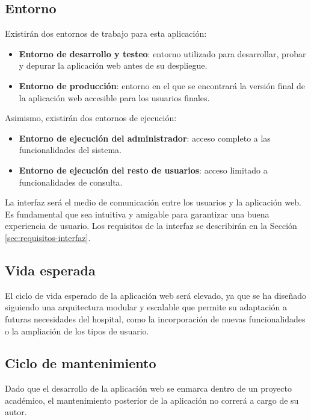 \subsection{Entorno}
Existirán dos entornos de trabajo para esta aplicación:

\begin{itemize}
\item \textbf{Entorno de desarrollo y testeo}: entorno utilizado para desarrollar, probar y depurar la aplicación web antes de su despliegue.
\item \textbf{Entorno de producción}: entorno en el que se encontrará la versión final de la aplicación web accesible para los usuarios finales.
\end{itemize}

Asimismo, existirán dos entornos de ejecución:

\begin{itemize}
\item \textbf{Entorno de ejecución del administrador}: acceso completo a las funcionalidades del sistema.
\item \textbf{Entorno de ejecución del resto de usuarios}: acceso limitado a funcionalidades de consulta.
\end{itemize}

La interfaz será el medio de comunicación entre los usuarios y la aplicación web. Es fundamental que sea intuitiva y amigable para garantizar una buena experiencia de usuario. Los requisitos de la interfaz se describirán en la Sección \ref{sec:requisitos-interfaz}.  
\subsection{Vida esperada}

    El ciclo de vida esperado de la aplicación web será elevado, ya que se ha diseñado siguiendo una
    arquitectura modular y escalable que permite su adaptación a futuras necesidades del hospital,
    como la incorporación de nuevas funcionalidades o la ampliación de los tipos de usuario.

\subsection{Ciclo de mantenimiento} \label{subsec:ciclo_mantenimiento}

Dado que el desarrollo de la aplicación web se enmarca dentro de un proyecto académico, el
mantenimiento posterior de la aplicación no correrá a cargo de su autor.

